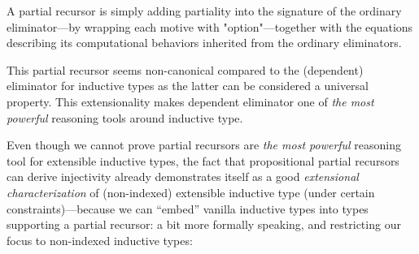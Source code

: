 
A partial recursor is simply adding partiality into the signature of the ordinary eliminator---by wrapping each motive with "option"---together 
with the equations describing its computational behaviors inherited from the ordinary eliminators.

This partial recursor seems non-canonical compared to the (dependent) eliminator for inductive types as the latter can be considered a universal property. This extensionality makes dependent eliminator one of \textit{the most powerful} reasoning tools around inductive type. 


Even though we cannot prove partial recursors are \textit{the
most powerful} reasoning tool for extensible inductive types,
the fact that propositional partial
recursors can derive injectivity already demonstrates itself as a good \textit{extensional characterization} of
(non-indexed) extensible inductive type (under certain
constraints)---because we can ``embed'' vanilla inductive types into
types supporting a partial recursor: a bit more formally speaking, and
restricting our focus to non-indexed inductive types:

